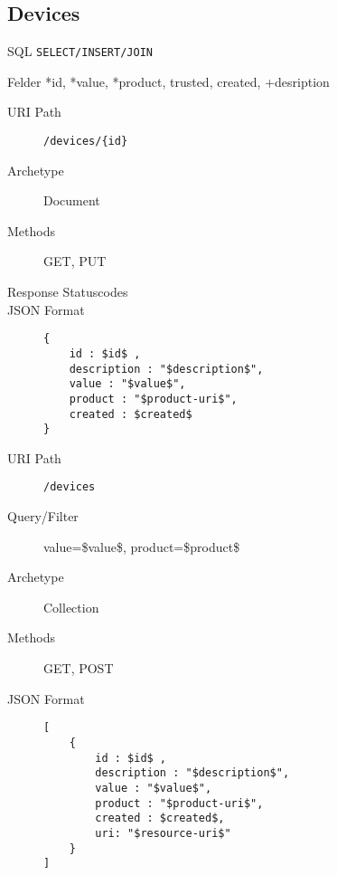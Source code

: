\documentclass[10pt,a4paper]{scrartcl}
\begin{document}
\pagebreak
\subsection{Devices}

\begin{description*}
    \item[SQL] \texttt{SELECT/INSERT/JOIN}
    \item[Felder] *id, *value, *product, trusted, created, +desription
\end{description*}


\begin{mdframed}[style=def]
\begin{description}
	\item[URI Path] \texttt{/devices/\{id\}}
	\item[Archetype] Document
	\item[Methods] GET, PUT
	\item[Response Statuscodes] \hfill
	\item[JSON Format] \hfill
\begin{lstlisting}
{
	id : $id$ ,
	description : "$description$",
	value : "$value$",
	product : "$product-uri$",
	created : $created$
}
\end{lstlisting}
\end{description}
\end{mdframed}

\begin{mdframed}[style=def]
\begin{description}
	\item[URI Path] \texttt{/devices}
	\item[Query/Filter]	value=\$value\$, product=\$product\$ 
	\item[Archetype] Collection
	\item[Methods] GET, POST
	\item[JSON Format] \hfill
\begin{lstlisting}
[
	{
	    id : $id$ ,
	    description : "$description$",
	    value : "$value$",
    	product : "$product-uri$",
    	created : $created$,
    	uri: "$resource-uri$"
    }
]
\end{lstlisting}
\end{description}
\end{mdframed}
\end{document}

